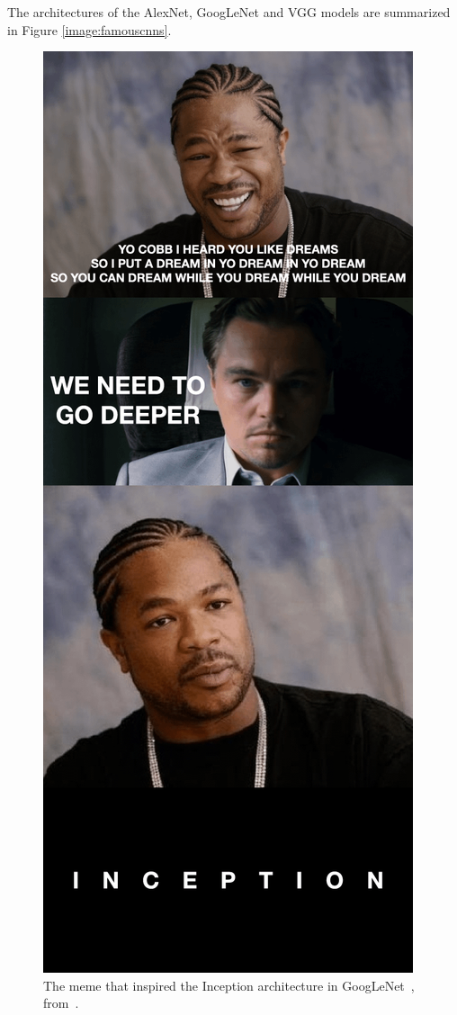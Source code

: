 \documentclass{article}
\begin{document}
The architectures of the AlexNet, GoogLeNet and VGG models are summarized in Figure \ref{image:famouscnns}.

\begin{figure}[h]
    \centering
    \includegraphics*[scale=0.2]{../images/ebd.png}
    \caption{The meme that inspired the Inception architecture in GoogLeNet~\cite{googlelenet}, from~\cite{we_need_to_go_deeper}.}
    \label{image:meme}
\end{figure}
\end{document}
